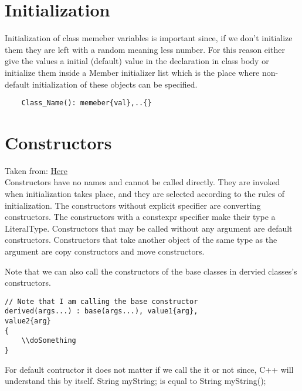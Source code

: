 \documentclass[11pt,twoside,a4paper]{report}
\begin{document}
\section{Initialization}
Initialization of class memeber variables is important since, if we don't initialize them they are left with a random meaning less number. For this reason either give the values a initial (default) value in the declaration in class body
or initialize them inside a Member initializer list which is the place where non-default initialization of these objects can be specified.
\begin{lstlisting}
    Class_Name(): memeber{val},..{}
\end{lstlisting}
\section{Constructors}
Taken from: \href{https://en.cppreference.com/w/cpp/language/constructor}{Here} \\
Constructors have no names and cannot be called directly. They are invoked when initialization takes place, and they are selected according to 
the rules of initialization. The constructors without explicit specifier are converting constructors. The constructors with a constexpr specifier 
make their type a LiteralType. Constructors that may be called without any argument are default constructors. Constructors that take another object of the same type as the argument are copy constructors and move constructors. 

Note that we can also call the constructors of the base classes in dervied classes's constructors.

\begin{lstlisting}
// Note that I am calling the base constructor
derived(args...) : base(args...), value1{arg}, 
value2{arg}
{
    \\doSomething
}
\end{lstlisting}

For default contructor it does not matter if we call the it or not since, C++ will understand this by itself.
String myString; is equal to String myString();
\end{document}
